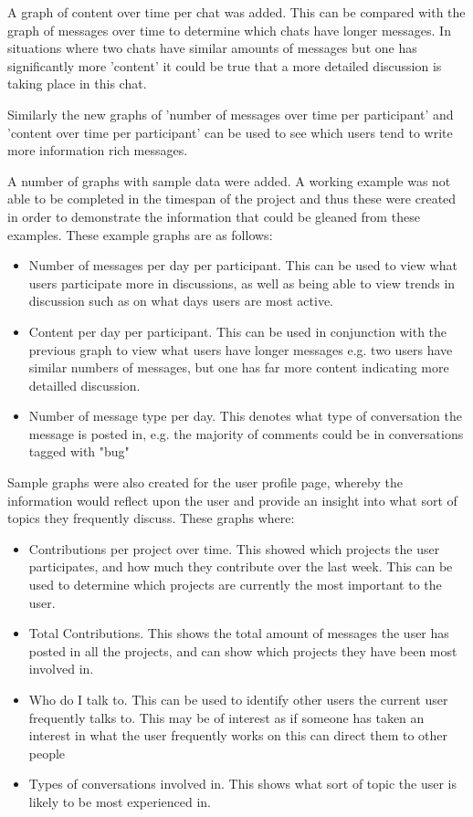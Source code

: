 \documentclass{l4proj}
\begin{document}
A graph of content over time per chat was added.  This can be compared with the graph of messages over time to determine which chats have longer messages.  In situations where two chats have similar amounts of messages but one has significantly more 'content' it could be true that a more detailed discussion is taking place in this chat.

Similarly the new graphs of 'number of messages over time per participant' and 'content over time per participant' can be used to see which users tend to write more information rich messages.

A number of graphs with sample data were added.  A working example was not able to be completed in the timespan of the project and thus these were created in order to demonstrate the information that could be gleaned from these examples.  These example graphs are as follows:

\begin{itemize}
\item Number of messages per day per participant.  This can be used to view what users participate more in discussions, as well as being able to view trends in discussion such as on what days users are most active.
\item Content per day per participant.  This can be used in conjunction with the previous graph to view what users have longer messages e.g. two users have similar numbers of messages, but one has far more content indicating more detailled discussion.
\item Number of message type per day.  This denotes what type of conversation the message is posted in, e.g. the majority of comments could be in conversations tagged with "bug"
\end{itemize}

Sample graphs were also created for the user profile page, whereby the information would reflect upon the user and provide an insight into what sort of topics they frequently discuss. These graphs where:

\begin{itemize}
\item Contributions per project over time.  This showed which projects the user participates, and how much they contribute over the last week.  This can be used to determine which projects are currently the most important to the user.
\item Total Contributions.  This shows the total amount of messages the user has posted in all the projects, and can show which projects they have been most involved in.
\item Who do I talk to.  This can be used to identify other users the current user frequently talks to.  This may be of interest as if someone has taken an interest in what the user frequently works on this can direct them to other people
\item Types of conversations involved in.  This shows what sort of topic the user is likely to be most experienced in. 
\end{itemize}
\end{document}
